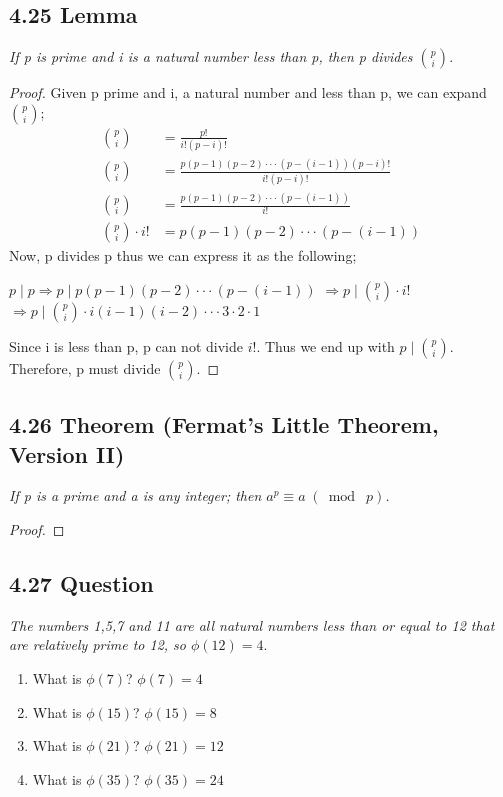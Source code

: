 \documentclass{article}
\begin{document}
\subsection*{4.25 Lemma} 
\quad \textit{If p is prime and i is a natural number less than p, then p divides $\binom{p}{i}$.}

\begin{proof}
Given p prime and i, a natural number and less than p, we can expand $\binom{p}{i}$;
\begin{align*}
    &&\binom{p}{i} &= \frac{p!}{i!(p-i)!}&&\\
    &&\binom{p}{i} &= \frac{p(p-1)(p-2)\cdot\cdot\cdot(p-(i-1))(p-i)!}{i!(p-i)!}&&\\
    &&\binom{p}{i} &= \frac{p(p-1)(p-2)\cdot\cdot\cdot(p-(i-1))}{i!}&&\\
    &&\binom{p}{i}\cdot i! &= p(p-1)(p-2)\cdot\cdot\cdot(p-(i-1))&&
\end{align*}
Now, p divides p thus we can express it as the following;
\begin{center}
    $p \mid p \Longrightarrow p \mid p(p-1)(p-2)\cdot\cdot\cdot(p-(i-1))$
    $\Longrightarrow p \mid \binom{p}{i}\cdot i!$
    $\Longrightarrow p \mid \binom{p}{i}\cdot i(i-1)(i-2)\cdot\cdot\cdot3\cdot2\cdot1$
\end{center}
Since i is less than p, p can not divide $i!$. Thus we end up with $p \mid \binom{p}{i}$. Therefore, p must divide $\binom{p}{i}$.
\end{proof}

\subsection*{4.26 Theorem (Fermat's Little Theorem, Version II)} 
\quad \textit{If p is a prime and a is any integer; then $a^{p} \equiv a \;(\bmod\; p)$.}

\begin{proof}
\end{proof}

\subsection*{4.27 Question} 
\quad \textit{The numbers 1,5,7 and 11 are all natural numbers less than or equal to 12 that are relatively prime to 12, so $\phi(12) = 4.$}

\begin{enumerate}
    \item What is $\phi(7)$? \textbf{$\phi(7) = 4$}
    \item What is $\phi(15)$? \textbf{$\phi(15) = 8$}
    \item What is $\phi(21)$? \textbf{$\phi(21) = 12$}
    \item What is $\phi(35)$? \textbf{$\phi(35) = 24$}
\end{enumerate}
\end{document}
